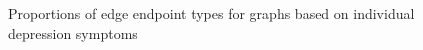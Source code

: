\documentclass[
]{article}
\begin{document}
\begin{figure}


\caption{\label{fig-sym-mat}Proportions of edge endpoint types for
graphs based on individual depression symptoms}

\end{figure}%
\end{document}
